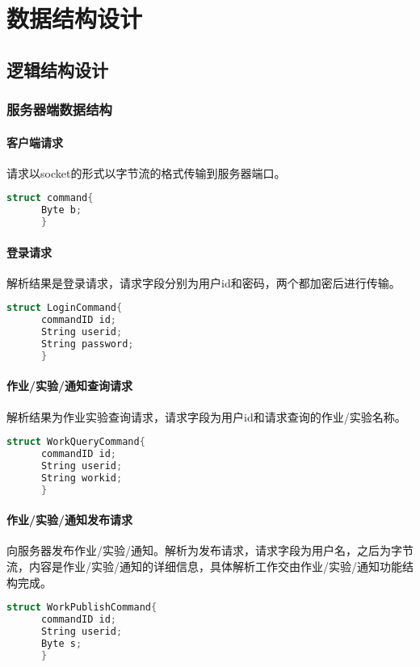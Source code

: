 \chapter{数据结构设计}
\section{逻辑结构设计}
  \subsection{服务器端数据结构}
    \subsubsection{客户端请求}
    请求以socket的形式以字节流的格式传输到服务器端口。
    \begin{lstlisting}[language=C,caption=客户端请求]
      struct command{
      Byte b;
      }
    \end{lstlisting}
    \subsubsection{登录请求}
    解析结果是登录请求，请求字段分别为用户id和密码，两个都加密后进行传输。
    \begin{lstlisting}[language=C,caption=客户端请求]
      struct LoginCommand{
      commandID id;
      String userid;
      String password;
      }
    \end{lstlisting}
    \subsubsection{作业/实验/通知查询请求}
    解析结果为作业实验查询请求，请求字段为用户id和请求查询的作业/实验名称。
    \begin{lstlisting}[language=C,caption=作业/实验/通知查询请求]
      struct WorkQueryCommand{
      commandID id;
      String userid;
      String workid;
      }
    \end{lstlisting}
    \subsubsection{作业/实验/通知发布请求}
    向服务器发布作业/实验/通知。解析为发布请求，请求字段为用户名，之后为字节流，内容是作业/实验/通知的详细信息，具体解析工作交由作业/实验/通知功能结构完成。
    \begin{lstlisting}[language=C,caption=作业/实验/通知发布请求]
      struct WorkPublishCommand{
      commandID id;
      String userid;
      Byte s;
      }
    \end{lstlisting}
